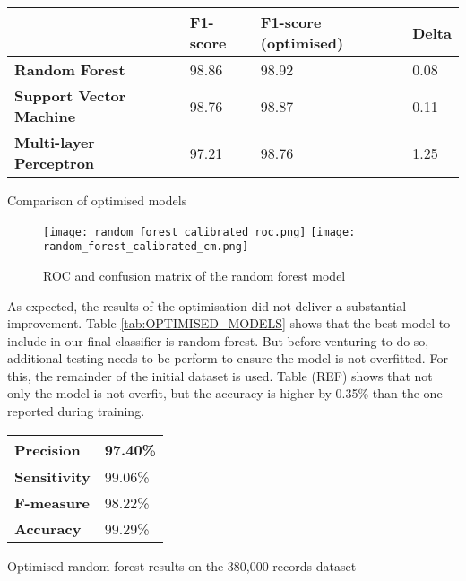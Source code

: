 \begin{singlespace}
	\begin{center}
		\label{tab:OPTIMISED_MODELS}
		\begin{tabular}{ | m{13em} | m{5em} | m{10em} | m{2.3em} |}
			\hline
			                                & \textbf{F1-score} & \textbf{F1-score (optimised)} & \textbf{Delta} \\
			\hline
			\textbf{Random Forest}          & 98.86             & 98.92                         & 0.08           \\
			\hline
			\textbf{Support Vector Machine} & 98.76             & 98.87                         & 0.11           \\
			\hline
			\textbf{Multi-layer Perceptron} & 97.21             & 98.76                         & 1.25           \\
			\hline
		\end{tabular}
		\captionsetup{type=table}\caption{Comparison of optimised models}
	\end{center}
\end{singlespace}


\begin{figure}[!b]
	\centering
	\texttt{[image: random\_forest\_calibrated\_roc.png]}
	\texttt{[image: random\_forest\_calibrated\_cm.png]}
	\caption{ROC and confusion matrix of the random forest model}
	\label{fig:OPTIMISED_RF}
\end{figure}

As expected, the results of the optimisation did not deliver a substantial improvement. Table \ref{tab:OPTIMISED_MODELS} shows that the best model to include in our final classifier is random forest. But before venturing to do so, additional testing needs to be perform to ensure the model is not overfitted. For this, the remainder of the initial dataset is used. Table (REF) shows that not only the model is not overfit, but the accuracy is higher by 0.35\% than the one reported during training.



\begin{singlespace}
	\begin{center}
		\label{tab:OPTIMISED_MODELS}
		\begin{tabular}{ | m{8em} | m{5em} |}
			\hline
			\textbf{Precision}   & 97.40\% \\
			\hline
			\textbf{Sensitivity} & 99.06\% \\
			\hline
			\textbf{F-measure}   & 98.22\% \\
			\hline
			\textbf{Accuracy}    & 99.29\% \\
			\hline
		\end{tabular}
		\captionsetup{type=table}\caption{ Optimised random forest results on the 380,000 records dataset}
	\end{center}
\end{singlespace}



